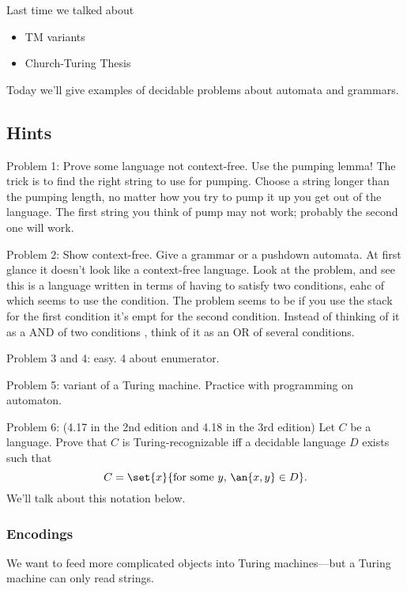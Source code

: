 
Last time we talked about
\begin{itemize}
\item
TM variants
\item
Church-Turing Thesis
\end{itemize}
Today we'll give examples of decidable problems about automata and grammars.

\subsection*{Hints}

Problem 1: Prove some language not context-free. Use the pumping lemma! The trick is to find the right string to use for pumping. Choose a string longer than the pumping length, no matter how you try to pump it up you get out of the language.
The first string you think of pump may not work; probably the second one will work. 

Problem 2: Show context-free.
Give a grammar or a pushdown automata. At first glance it doesn't look like a context-free language. Look at the problem, and see this is a language written in terms of having to satisfy two conditions, eahc of which seems to use the condition. The problem seems to be if you use the stack for the first condition it's empt for the second condition. Instead of thinking of it as a AND of two conditions , think of it as an OR of several conditions.

Problem 3 and 4: easy. 4 about enumerator.

Problem 5: variant of a Turing machine. Practice with programming on automaton.

Problem 6: (4.17 in the 2nd edition and 4.18 in the 3rd edition) Let $C$ be a language. Prove that $C$ is Turing-recognizable iff a decidable language $D$ exists such that 
\[
C=\set{x}{\text{for some }y,\,\an{x,y}\in D}.
\]
We'll talk about this notation below.

\subsubsection{Encodings}

We want to feed more complicated objects into Turing machines---but a Turing machine can only read strings.

